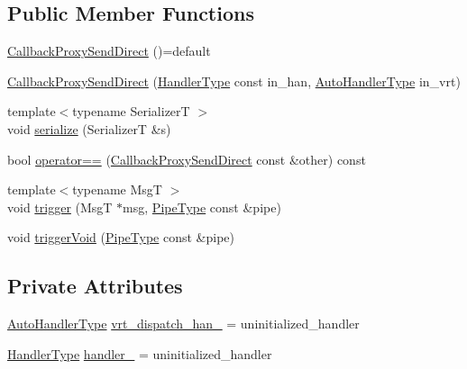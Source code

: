 \subsection*{Public Member Functions}
\begin{DoxyCompactItemize}
\item 
\hyperlink{structvt_1_1pipe_1_1callback_1_1_callback_proxy_send_direct_a9dd9c90d3e2b112d9df3c04626d6c272}{Callback\+Proxy\+Send\+Direct} ()=default
\item 
\hyperlink{structvt_1_1pipe_1_1callback_1_1_callback_proxy_send_direct_ae864e787c012e11651ddd185ec6b31bf}{Callback\+Proxy\+Send\+Direct} (\hyperlink{namespacevt_af64846b57dfcaf104da3ef6967917573}{Handler\+Type} const in\+\_\+han, \hyperlink{structvt_1_1pipe_1_1callback_1_1_callback_proxy_send_direct_adbd70e6c1d6b374083e5d0babdcab07e}{Auto\+Handler\+Type} in\+\_\+vrt)
\item 
{\footnotesize template$<$typename SerializerT $>$ }\\void \hyperlink{structvt_1_1pipe_1_1callback_1_1_callback_proxy_send_direct_a1a64835cb030af898ad2beaec56d7887}{serialize} (SerializerT \&s)
\item 
bool \hyperlink{structvt_1_1pipe_1_1callback_1_1_callback_proxy_send_direct_a8ccc6351627fe71b4ca82d2ce2a5a7c1}{operator==} (\hyperlink{structvt_1_1pipe_1_1callback_1_1_callback_proxy_send_direct}{Callback\+Proxy\+Send\+Direct} const \&other) const
\item 
{\footnotesize template$<$typename MsgT $>$ }\\void \hyperlink{structvt_1_1pipe_1_1callback_1_1_callback_proxy_send_direct_a17ec0811bb79213d0b99c7f7bcfa697d}{trigger} (MsgT $\ast$msg, \hyperlink{namespacevt_ac9852acda74d1896f48f406cd72c7bd3}{Pipe\+Type} const \&pipe)
\item 
void \hyperlink{structvt_1_1pipe_1_1callback_1_1_callback_proxy_send_direct_a76e8f94a55e1855087d149a498953492}{trigger\+Void} (\hyperlink{namespacevt_ac9852acda74d1896f48f406cd72c7bd3}{Pipe\+Type} const \&pipe)
\end{DoxyCompactItemize}
\subsection*{Private Attributes}
\begin{DoxyCompactItemize}
\item 
\hyperlink{structvt_1_1pipe_1_1callback_1_1_callback_proxy_send_direct_adbd70e6c1d6b374083e5d0babdcab07e}{Auto\+Handler\+Type} \hyperlink{structvt_1_1pipe_1_1callback_1_1_callback_proxy_send_direct_a665d0e3eddc6aecea9112457ae96dae4}{vrt\+\_\+dispatch\+\_\+han\+\_\+} = uninitialized\+\_\+handler
\item 
\hyperlink{namespacevt_af64846b57dfcaf104da3ef6967917573}{Handler\+Type} \hyperlink{structvt_1_1pipe_1_1callback_1_1_callback_proxy_send_direct_a812b76a919292c66abd4ad0326011129}{handler\+\_\+} = uninitialized\+\_\+handler
\end{DoxyCompactItemize}


